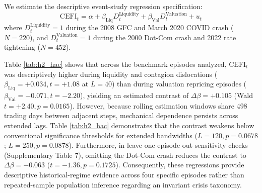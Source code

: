 \documentclass[review,12pt,authoryear]{elsarticle}
\begin{document}
We estimate the descriptive event-study regression specification:
\begin{equation}
\mathrm{CEFI}_t = \alpha + \beta_{\text{Liq}} D_t^{\text{Liquidity}} + \beta_{\text{Val}} D_t^{\text{Valuation}} + u_t
\label{eq:h2_reg_spec}
\end{equation}
where $D_t^{\text{Liquidity}} = 1$ during the 2008 GFC and March 2020 COVID crash ($N=220$), and $D_t^{\text{Valuation}} = 1$ during the 2000 Dot-Com crash and 2022 rate tightening ($N=452$).

\begin{table}[htbp]
\centering
\caption{Descriptive Historical Regime Regressions: Sensitivity Across Extended HAC Lag Bandwidths ($L = 20$ to $L = 250$)}
\label{tab:h2_hac}
\end{table}

Table \ref{tab:h2_hac} shows that across the benchmark episodes analyzed, $\mathrm{CEFI}_t$ was descriptively higher during liquidity and contagion dislocations ($\beta_{\text{Liq}} = +0.034, t = +1.08$ at $L=40$) than during valuation repricing episodes ($\beta_{\text{Val}} = -0.071, t = -2.20$), yielding an estimated contrast of $\Delta \beta = +0.105$ (Wald $t = +2.40, p = 0.0165$). However, because rolling estimation windows share 498 trading days between adjacent steps, mechanical dependence persists across extended lags. Table \ref{tab:h2_hac} demonstrates that the contrast weakens below conventional significance thresholds for extended bandwidths ($L=120, p=0.0678$; $L=250, p=0.0878$). Furthermore, in leave-one-episode-out sensitivity checks (Supplementary Table 7), omitting the Dot-Com crash reduces the contrast to $\Delta \beta = -0.063$ ($t = -1.36, p = 0.1725$). Consequently, these regressions provide descriptive historical-regime evidence across four specific episodes rather than repeated-sample population inference regarding an invariant crisis taxonomy.
\end{document}
